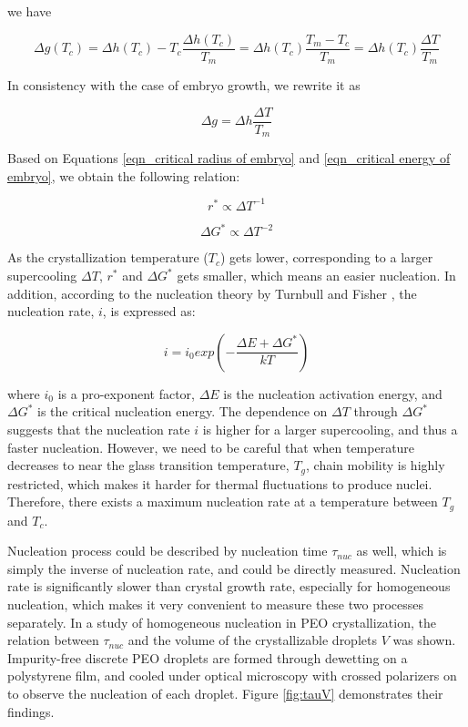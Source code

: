 \noindent
we have

\begin{equation}
\label{eqn_Delta g Tc}
\Delta g(T_{c}) = \Delta h(T_{c}) - T_{c} \dfrac{\Delta h(T_{c})}{T_{m}} = \Delta h(T_{c}) \dfrac{T_{m} - T_{c}}{T_{m}} = \Delta h(T_{c}) \dfrac{\Delta T}{T_{m}}
\end{equation}

In consistency with the case of embryo growth, we rewrite it as

\begin{equation}
\label{eqn_Delta g of embryo}
\Delta g = \Delta h \dfrac{\Delta T}{T_{m}}
\end{equation}

Based on Equations \ref{eqn_critical radius of embryo} and \ref{eqn_critical energy of embryo}, we obtain the following relation:

\begin{equation}
\label{eqn_relation for r}
r^{*} \propto \Delta T^{-1}
\end{equation}

\begin{equation}
\label{eqn_relation for G}
\Delta G^{*} \propto \Delta T^{-2}
\end{equation}

As the crystallization temperature ($T_{c}$) gets lower, corresponding to a larger supercooling $\Delta T$, $r^{*}$ and $\Delta G^{*}$ gets smaller, which means an easier nucleation. In addition, according to the nucleation theory by Turnbull and Fisher \cite{Turnbull1949}, the nucleation rate, $i$, is expressed as:

\begin{equation}
\label{eqn_nucleation rate}
i = i_{0}exp(- \dfrac{\Delta E + \Delta G^{*}}{k T})
\end{equation}

\noindent
where $i_{0}$ is a pro-exponent factor, $\Delta E$ is the nucleation activation energy, and $\Delta G^{*}$ is the critical nucleation energy. The dependence on $\Delta T$ through $\Delta G^{*}$ suggests that the nucleation rate $i$ is higher for a larger supercooling, and thus a faster nucleation. However, we need to be careful that when temperature decreases to near the glass transition temperature, $T_{g}$, chain mobility is highly restricted, which makes it harder for thermal fluctuations to produce nuclei. Therefore, there exists a maximum nucleation rate at a temperature between $T_{g}$ and $T_{c}$.

Nucleation process could be described by nucleation time $\tau _{nuc}$ as well, which is simply the inverse of nucleation rate, and could be directly measured. Nucleation rate is significantly slower than crystal growth rate, especially for homogeneous nucleation, which makes it very convenient to measure these two processes separately. In a study \cite{Massa2004} of homogeneous nucleation in PEO crystallization, the relation between $\tau _{nuc}$ and the volume of the crystallizable droplets $V$ was shown. Impurity-free discrete PEO droplets are formed through dewetting on a polystyrene film, and cooled under optical microscopy with crossed polarizers on to observe the nucleation of each droplet. Figure \ref{fig:tauV} demonstrates their findings.

